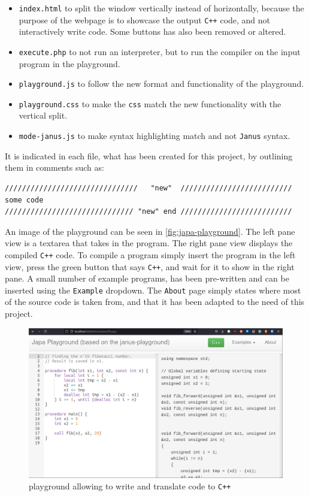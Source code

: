 \begin{itemize}
    \item \texttt{index.html} to split the window vertically instead of horizontally,
          because the purpose of the webpage is to showcase the output \texttt{C++}
          code, and not interactively write \lan code. Some buttons has also been
          removed or altered.

    \item \texttt{execute.php} to not run an interpreter, but to run the \lan compiler
          on the input program in the playground.

    \item \texttt{playground.js} to follow the new format and functionality of the playground.

    \item \texttt{playground.css} to make the \texttt{css} match the new functionality with
          the vertical split.

    \item \texttt{mode-janus.js} to make syntax highlighting match \lan and not
          \texttt{Janus} syntax.
\end{itemize}
\noindent
It is indicated in each file, what has been created for this project, by outlining them
in comments such as:
\begin{lstlisting}
///////////////////////////////   "new"  //////////////////////////
some code
////////////////////////////// "new" end //////////////////////////
\end{lstlisting}
\noindent
An image of the \lan playground can be seen in \autoref{fig:japa-playground}.
The left pane view is a textarea that takes in the \lan program. The right pane view
displays the compiled \texttt{C++} code. To compile a \lan program simply insert the program
in the left view, press the green button that says \texttt{C++}, and wait for it to show
in the right pane. A small number of example programs, has been pre-written and can be inserted
using the \texttt{Example} dropdown. The \texttt{About} page simply states where most of the
source code is taken from, and that it has been adapted to the need of this project.

\begin{figure}[H]
    \centering
    \includegraphics[width=\textwidth]{imgs/japa-playground.png}
    \caption{\lan playground allowing to write and translate \lan code to \texttt{C++}}
    \label{fig:japa-playground}
\end{figure}